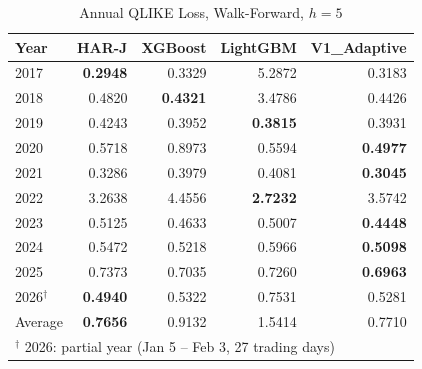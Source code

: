 \begin{table}[htbp]
\centering
\caption{Annual QLIKE Loss, Walk-Forward, $h=5$}
\label{tab:qlike_wf_h5}
\begin{tabular}{lrrrr}
\toprule
Year & HAR-J & XGBoost & LightGBM & V1\_Adaptive \\
\midrule
2017 & \textbf{0.2948} & 0.3329 & 5.2872 & 0.3183 \\
2018 & 0.4820 & \textbf{0.4321} & 3.4786 & 0.4426 \\
2019 & 0.4243 & 0.3952 & \textbf{0.3815} & 0.3931 \\
2020 & 0.5718 & 0.8973 & 0.5594 & \textbf{0.4977} \\
2021 & 0.3286 & 0.3979 & 0.4081 & \textbf{0.3045} \\
2022 & 3.2638 & 4.4556 & \textbf{2.7232} & 3.5742 \\
2023 & 0.5125 & 0.4633 & 0.5007 & \textbf{0.4448} \\
2024 & 0.5472 & 0.5218 & 0.5966 & \textbf{0.5098} \\
2025 & 0.7373 & 0.7035 & 0.7260 & \textbf{0.6963} \\
2026$^{\dagger}$ & \textbf{0.4940} & 0.5322 & 0.7531 & 0.5281 \\
\midrule
Average & \textbf{0.7656} & 0.9132 & 1.5414 & 0.7710 \\
\bottomrule
\multicolumn{5}{l}{\footnotesize $^\dagger$ 2026: partial year (Jan 5 -- Feb 3, 27 trading days)} \\
\end{tabular}
\end{table}